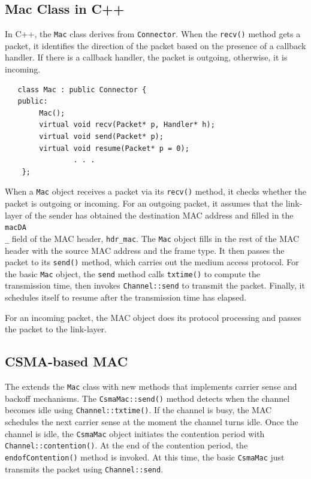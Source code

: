 \subsection{Mac Class in C++}
\label{sec:maccplus}

In C++, the {\tt Mac} class derives from {\tt Connector}.  When the
{\tt recv()} method gets a packet, it identifies the direction of the
packet based on the presence of a callback handler.  If there is a
callback handler, the packet is outgoing, otherwise, it is incoming.

\begin{verbatim}
   class Mac : public Connector {
   public:
        Mac();
        virtual void recv(Packet* p, Handler* h);
        virtual void send(Packet* p);
        virtual void resume(Packet* p = 0);
                . . .
    };
\end{verbatim}

When a {\tt Mac} object receives a packet via its {\tt recv()} method,
it checks whether the packet is outgoing or incoming.  For an outgoing
packet, it assumes that the link-layer of the sender has obtained the
destination MAC address and filled in the {\tt macDA\\_} field of the
MAC header, {\tt hdr\_mac}.  The {\tt Mac} object fills in the rest of
the MAC header with the source MAC address and the frame type.  It then
passes the packet to its {\tt send()} method, which carries out the
medium access protocol.  For the basic {\tt Mac} object, the
{\tt send} method calls {\tt txtime()} to compute the transmission
time, then invokes {\tt Channel::send} to transmit the packet.  
Finally, it 
schedules itself to resume after the transmission time has elapsed.

For an incoming packet, the MAC object does its protocol processing and
passes the packet to the link-layer.

\subsection{CSMA-based MAC}

The  extends the {\tt Mac} class
with new methods that implements carrier sense and backoff mechanisms.
The {\tt CsmaMac::send()} method detects when the channel becomes idle
using {\tt Channel::txtime()}.  If the channel is busy, the MAC
schedules the next carrier sense at the moment the channel turns idle.
Once the channel is idle, the {\tt CsmaMac} object initiates the
contention period with {\tt Channel::contention()}.  At the end of the
contention period, the {\tt endofContention()} method is invoked.  At
this time, the basic {\tt CsmaMac} just transmits the packet using
{\tt Channel::send}.

